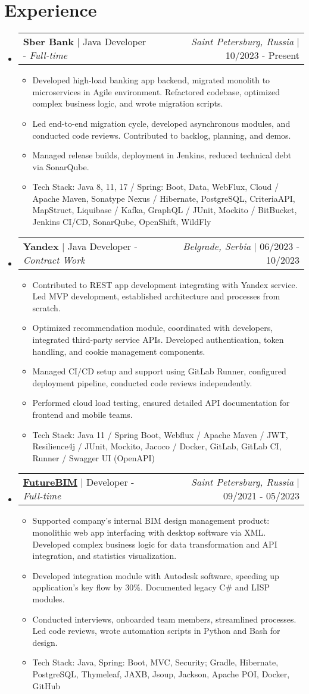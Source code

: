 \documentclass[letterpaper,12pt]{article}
\makeatletter
\newcommand{\resumeItem}[1]{
  \item\small{
    {#1 \vspace{-2pt}}
  }
}
\newcommand{\resumeProjectHeading}[2]{
    \item
    \begin{tabular*}{0.97\textwidth}{l@{\extracolsep{\fill}}r}
      \small#1 & #2 \\
    \end{tabular*}\vspace{-7pt}
}
\newcommand{\resumeSubHeadingListStart}{\begin{itemize}[leftmargin=0.15in, label={}]}
\newcommand{\resumeSubHeadingListEnd}{\end{itemize}}
\newcommand{\resumeItemListStart}{\begin{itemize}}
\newcommand{\resumeItemListEnd}{\end{itemize}\vspace{-5pt}}
\makeatother
\begin{document}
\section{Experience}
\resumeSubHeadingListStart
\resumeProjectHeading
{\textbf{Sber Bank} $|$ {Java Developer - \emph{Full-time}}}
{\footnotesize\emph{Saint Petersburg, Russia} $|$ {10/2023 - Present}}
\resumeItemListStart
\resumeItem{Developed high-load banking app backend, migrated monolith to microservices in Agile environment. Refactored codebase, optimized complex business logic, and wrote migration scripts.}
\resumeItem{Led end-to-end migration cycle, developed asynchronous modules, and conducted code reviews. Contributed to backlog, planning, and demos.}
\resumeItem{Managed release builds, deployment in Jenkins, reduced technical debt via SonarQube.}
\resumeItem{Tech Stack: Java 8, 11, 17 / Spring: Boot, Data, WebFlux, Cloud / Apache Maven, Sonatype Nexus / Hibernate, PostgreSQL, CriteriaAPI, MapStruct, Liquibase / Kafka, GraphQL / JUnit, Mockito / BitBucket, Jenkins CI/CD, SonarQube, OpenShift, WildFly}
        \resumeItemListEnd
        \resumeProjectHeading
{\textbf{Yandex} $|$ {Java Developer - \emph{Contract Work}}}
{\footnotesize\emph{Belgrade, Serbia} $|$ {06/2023 - 10/2023}}
\resumeItemListStart
\resumeItem{Contributed to REST app development integrating with Yandex service. Led MVP development, established architecture and processes from scratch.}
\resumeItem{Optimized recommendation module, coordinated with developers, integrated third-party service APIs. Developed authentication, token handling, and cookie management components.}
\resumeItem{Managed CI/CD setup and support using GitLab Runner, configured deployment pipeline, conducted code reviews independently.}
\resumeItem{Performed cloud load testing, ensured detailed API documentation for frontend and mobile teams.}
\resumeItem{Tech Stack: Java 11 / Spring Boot, Webflux / Apache Maven / JWT, Resilience4j / JUnit, Mockito, Jacoco / Docker, GitLab, GitLab CI, Runner / Swagger UI (OpenAPI)}
\resumeItemListEnd
        \resumeProjectHeading
        {\textbf{\href{https://futurebim.ru/ru}{FutureBIM}} $|$ {Developer - \emph{Full-time}}}
        {\footnotesize\emph{Saint Petersburg, Russia} $|$ {09/2021 - 05/2023}}
        \resumeItemListStart
            
\resumeItem{Supported company's internal BIM design management product: monolithic web app interfacing with desktop software via XML. Developed complex business logic for data transformation and API integration, and statistics visualization.}
\resumeItem{Developed integration module with Autodesk software, speeding up application's key flow by 30\%. Documented legacy C\# and LISP modules.}
\resumeItem{Conducted interviews, onboarded team members, streamlined processes. Led code reviews, wrote automation scripts in Python and Bash for design.}
\resumeItem{Tech Stack: Java, Spring: Boot, MVC, Security; Gradle, Hibernate, PostgreSQL, Thymeleaf, JAXB, Jsoup, Jackson, Apache POI, Docker, GitHub}
        \resumeItemListEnd
    \resumeSubHeadingListEnd
\end{document}
